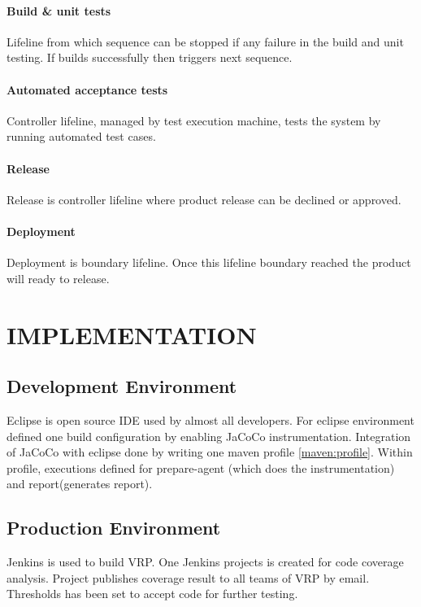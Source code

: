 \documentclass[a4paper,oneside,1,english1pt]{report}
\begin{document}
		\subsubsection{Build \& unit tests}
		Lifeline from which sequence can be stopped if any failure in the build and unit testing. If builds successfully then triggers next sequence.
	
		\subsubsection{Automated acceptance tests}
		Controller lifeline, managed by test execution machine, tests the system by running automated test cases.
		
		\subsubsection{Release}
		Release is controller lifeline where product release can be declined or approved.
		
		\subsubsection{Deployment}
		Deployment is boundary lifeline. Once this lifeline boundary reached the product will ready to release.\\
\chapter{\uppercase{Implementation}}
	\section{Development Environment}
		Eclipse is open source IDE used by almost all developers. For eclipse environment defined one build configuration by enabling JaCoCo instrumentation. Integration of JaCoCo with eclipse done by writing one maven profile \ref{maven:profile}. Within profile, executions defined for prepare-agent (which does the instrumentation) and report(generates report).
	\section{Production Environment}
		\par Jenkins is used to build \ac{VRP}. One Jenkins projects is created for code coverage analysis. Project publishes coverage result to all teams of \ac{VRP} by email. Thresholds has been set to accept code for further testing.
		
\end{document}
